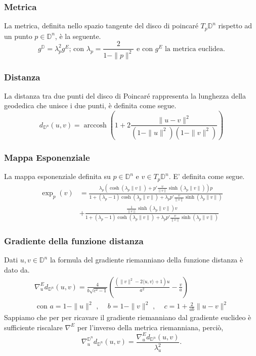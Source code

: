\documentclass[a4paper, 12pt]{article}
\DeclareMathOperator\arccosh{arccosh}
\begin{document}
\subsubsection{Metrica}
La metrica, definita nello spazio tangente del disco di poincaré $T_p\mathbb{D}^n$ rispetto ad un punto $p \in \mathbb{D}^n$, è la seguente.\\
\[g^\mathbb{D} = \lambda_p^2 g^E \mbox{; con } \lambda_p = \frac{2}{1- \| p \|^2} \mbox{ e con } g^E \mbox{ la metrica euclidea}.\]
\subsubsection{Distanza}
La distanza tra due punti del disco di Poincaré rappresenta la lunghezza della geodedica che unisce i due punti, è definita come segue.\\
\[d_{\mathbb{D}^n}(u, v) = \arccosh \left(1 + 2\frac{\| u - v\|^2}{(1-\| u \|^2)(1-\| v \|^2)} \right)\]
\subsubsection{Mappa Esponenziale}
La mappa esponenziale definita su $p \in \mathbb{D}^n$ e $v \in T_p\mathbb{D}^n$. E' definita come segue.\\
\begin{equation*}\begin{split}
\exp_p(v) &= \frac{\lambda_p (\cosh(\lambda_p \| v \|) + p'\frac{v}{\| v \|} \sinh(\lambda_p \| v \|))p}{1 + (\lambda_p - 1) \cosh(\lambda_p \| v \|) + \lambda_p p ' \frac{v}{\| v \|} \sinh(\lambda_p \| v \|)} \\
&+ \frac{\frac{1}{\| v \|} \sinh(\lambda_p \| v \|) v}{1 + (\lambda_p - 1) \cosh(\lambda_p \| v \|) + \lambda_p p' \frac{v}{\| v \|} \sinh(\lambda_p \| v \|)}
\end{split}\end{equation*}
\subsubsection{Gradiente della funzione distanza}
Dati $u,v \in \mathbb{D}^n$ la formula del gradiente riemanniano della funzione distanza è dato da.\\
\begin{equation*}\begin{gathered}
\nabla_u^{E} d_{\mathbb{D}^n}(u,v) = \frac{4}{b \sqrt{c^2 - 1}} \left(\frac{(\| v \|^2 - 2\langle u,v \rangle + 1)u}{a^2} - \frac{v}{a}\right) \\ \mbox{ con } a = 1 - \| u \|^2 \mbox{ , } \quad b = 1 - \| v \|^2 \mbox{ , } \quad c = 1 + \frac{2}{ab} \| u - v \|^2
\end{gathered}\end{equation*}
Sappiamo che per per ricavare il gradiente riemanniano dal gradiente euclideo è sufficiente riscalare $\nabla^E$ per l'inverso della metrica riemanniana, perciò,\\ \[\nabla_u^{\mathbb{D}^n} d_{\mathbb{D}^n}(u,v) = \frac{\nabla_u^{E} d_{\mathbb{D}^n}(u,v)}{\lambda_u^2}.\]
\end{document}
